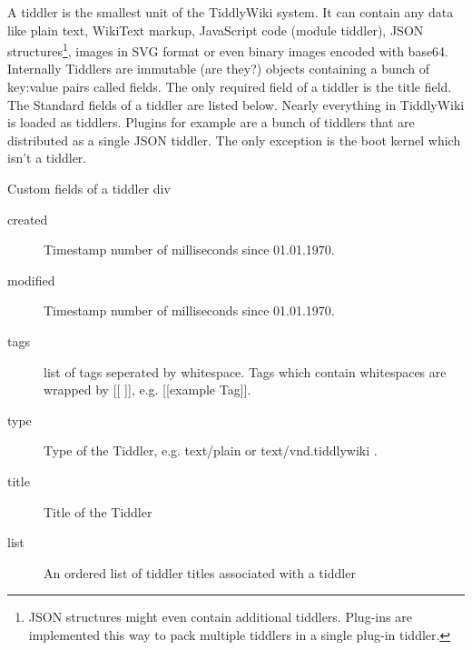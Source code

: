 \documentclass[12pt,a4paper]{article}
\begin{document}
A tiddler is the smallest unit of the TiddlyWiki system. It can contain any data like plain text, WikiText markup, JavaScript code (module tiddler), JSON structures\footnote{JSON structures might even contain additional tiddlers. Plug-ins are implemented this way to pack multiple tiddlers in a single plug-in tiddler.}, images in SVG format or even binary images encoded with base64.
Internally Tiddlers are immutable (are they?) objects containing a bunch of key:value pairs called fields. The only required field of a tiddler is the title field. The Standard fields of a tiddler are listed below. Nearly everything in TiddlyWiki is loaded as tiddlers. Plugins for example are a bunch of tiddlers that are distributed as a single JSON tiddler. The only exception is the boot kernel which isn't a tiddler.
\begin{lablist}
\caption{Custom fields of a tiddler div}
\label{list:TiddlerFields}
\begin{description}
\item[created] Timestamp number of milliseconds since 01.01.1970.
\item[modified] Timestamp number of milliseconds since 01.01.1970.
\item[tags] list of tags seperated by whitespace. Tags which contain whitespaces are wrapped by [[ ]], e.g. [[example Tag]].
\item[type] Type of the Tiddler, e.g. text/plain or text/vnd.tiddlywiki .
\item[title] Title of the Tiddler
\item[list] An ordered list of tiddler titles associated with a tiddler
\end{description}
\end{lablist}
\end{document}
